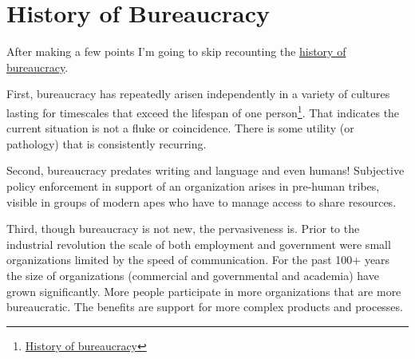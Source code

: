 \section*{History of Bureaucracy}

After making a few points I'm going to skip recounting the \href{https://en.wikipedia.org/wiki/Bureaucracy#History}{history of bureaucracy}.  %

First, bureaucracy has repeatedly arisen independently in a variety of cultures lasting for timescales that exceed the lifespan of one person\footnote{\href{https://www.youtube.com/watch?v=B_nsZlcC12g}{History of bureaucracy}}. That indicates the current situation is not a fluke or coincidence. There is some utility (or pathology) that is consistently recurring. 


Second, bureaucracy predates writing and language and even humans! Subjective policy enforcement in support of an organization arises in pre-human tribes, visible in groups of modern apes who have to manage access to share resources. 

Third, though bureaucracy is not new, the pervasiveness is. Prior to the industrial revolution the scale of both employment and government were small organizations limited by the speed of communication. For the past 100+ years the size of organizations (commercial and governmental and academia) have grown significantly. More people participate in more organizations that are more bureaucratic. The benefits are support for more complex products and processes. 

